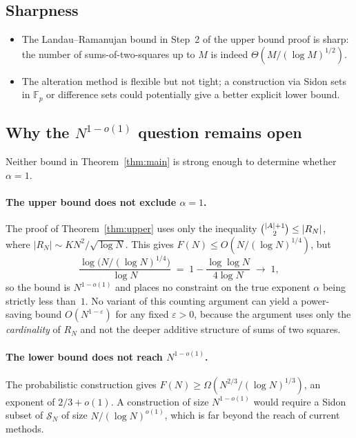 \documentclass[12pt]{article}
\theoremstyle{definition}
\newcommand{\SN}{\mathcal{S}_N}
\begin{document}
\subsection{Sharpness}

\begin{itemize}
\item The Landau--Ramanujan bound in Step~2 of the upper bound proof is sharp:
  the number of sums-of-two-squares up to $M$ is indeed $\Theta(M/(\log M)^{1/2})$.
\item The alteration method is flexible but not tight; a construction via
  Sidon sets in $\mathbb{F}_p$ or difference sets could potentially give a
  better explicit lower bound.
\end{itemize}

\subsection{Why the $N^{1-o(1)}$ question remains open}

Neither bound in Theorem~\ref{thm:main} is strong enough to determine
whether $\alpha = 1$.

\paragraph{The upper bound does not exclude $\alpha = 1$.}
The proof of Theorem~\ref{thm:upper} uses only the inequality
$\tbinom{|A|+1}{2} \le |R_N|$, where $|R_N| \sim KN^2/\sqrt{\log N}$.
This gives $F(N) \le O(N/(\log N)^{1/4})$, but
\[
  \frac{\log\bigl(N/(\log N)^{1/4}\bigr)}{\log N}
  \;=\; 1 - \frac{\log\log N}{4\log N} \;\longrightarrow\; 1,
\]
so the bound is $N^{1-o(1)}$ and places no constraint on
the true exponent $\alpha$ being strictly less than~$1$.
No variant of this counting argument can yield a power-saving bound
$O(N^{1-\varepsilon})$ for any fixed $\varepsilon > 0$, because the
argument uses only the \emph{cardinality} of $R_N$ and not the deeper
additive structure of sums of two squares.

\paragraph{The lower bound does not reach $N^{1-o(1)}$.}
The probabilistic construction gives $F(N) \ge \Omega(N^{2/3}/(\log N)^{1/3})$,
an exponent of $2/3 + o(1)$.  A construction of size $N^{1-o(1)}$
would require a Sidon subset of $\SN$ of size $N/(\log N)^{o(1)}$, which
is far beyond the reach of current methods.
\end{document}
